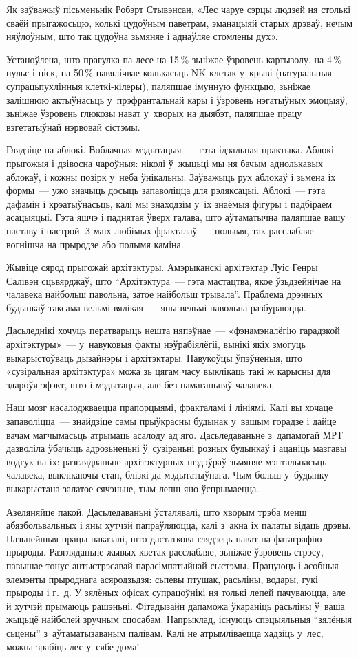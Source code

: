 Як заўважыў пісьменьнік Робэрт Стывэнсан, «Лес чаруе сэрцы людзей ня столькі сваёй прыгажосьцю, колькі цудоўным паветрам, эманацыяй старых дрэваў, нечым няўлоўным, што так цудоўна зьмяняе і аднаўляе стомлены дух».

Устаноўлена, што прагулка па лесе на 15\,\% зьніжае ўзровень картызолу, на 4\,\% пульс і ціск, на 50\,\% павялічвае колькасьць NK-клетак у~крыві (натуральныя супрацьпухлінныя клеткі-кілеры), паляпшае імунную функцыю, зьніжае залішнюю актыўнасьць у~прэфрантальнай кары і ўзровень нэгатыўных эмоцыяў, зьніжае ўзровень глюкозы нават у~хворых на дыябэт, паляпшае працу вэгетатыўнай нэрвовай сістэмы.

Глядзіце на аблокі. Воблачная мэдытацыя~--- гэта ідэальная практыка. Аблокі прыгожыя і дзівосна чароўныя: ніколі ў~жыцьці мы ня бачым аднолькавых аблокаў, і кожны позірк у~неба ўнікальны. Заўважыць рух аблокаў і зьмена іх формы~--- ужо значыць досыць запаволіцца для рэляксацыі. Аблокі~--- гэта дафамін і крэатыўнасьць, калі мы знаходзім у~іх знаёмыя фігуры і падбіраем асацыяцыі. Гэта яшчэ і паднятая ўверх галава, што аўтаматычна паляпшае вашу паставу і настрой. З маіх любімых фракталаў~--- полымя, так расслабляе вогнішча на прыродзе або полымя каміна.

Жывіце сярод прыгожай архітэктуры. Амэрыканскі архітэктар Луіс Генры Салівэн сцьвярджаў, што ``Архітэктура~--- гэта мастацтва, якое ўзьдзейнічае на чалавека найбольш павольна, затое найбольш трывала''. Праблема дрэнных будынкаў таксама вельмі вялікая~--- яны вельмі павольна разбураюцца. 

Дасьледнікі хочуць ператварыць нешта няпэўнае~--- «фэнамэналёгію гарадзкой архітэктуры»~--- у~навуковыя факты нэўрабіялёгіі, вынікі якіх змогуць выкарыстоўваць дызайнэры і архітэктары. Навукоўцы ўпэўненыя, што «сузіральная архітэктура» можа зь цягам часу выклікаць такі ж карысны для здароўя эфэкт, што і мэдытацыя, але без намаганьняў чалавека.

Наш мозг насалоджваецца прапорцыямі, фракталамі і лініямі. Калі вы хочаце запаволіцца~--- знайдзіце самы прыўкрасны будынак у~вашым горадзе і дайце вачам магчымасьць атрымаць асалоду ад яго. Дасьледаваньне з~дапамогай МРТ дазволіла ўбачыць адрозьненьні ў~сузіраньні розных будынкаў і ацаніць мазгавы водгук на іх: разглядваньне архітэктурных шэдэўраў зьмяняе мэнтальнасьць чалавека, выклікаючы стан, блізкі да мэдытатыўнага. Чым больш у~будынку выкарыстана залатое сячэньне, тым лепш яно ўспрымаецца.

Азеляняйце пакой. Дасьледаваньні ўсталявалі, што хворым трэба менш абязбольвальных і яны хутчэй папраўляюцца, калі з~акна іх палаты відаць дрэвы. Пазьнейшыя працы паказалі, што дастаткова глядзець нават на фатаграфію прыроды. Разгляданьне жывых кветак расслабляе, зьніжае ўзровень стрэсу, павышае тонус антыстрэсавай парасімпатыйнай сыстэмы. Працуюць і асобныя элемэнты прыроднага асяродзьдзя: сьпевы птушак, расьліны, водары, гукі прыроды і г.~д. У зялёных офісах супрацоўнікі ня толькі лепей пачуваюцца, але й хутчэй прымаюць рашэньні. Фітадызайн дапаможа ўкараніць расьліны ў~ваша жыцьцё найболей зручным спосабам. Напрыклад, існуюць спэцыяльныя ``зялёныя сьцены'' з~аўтаматызаваным палівам. Калі не атрымліваецца хадзіць у~лес, можна зрабіць лес у~сябе дома!

